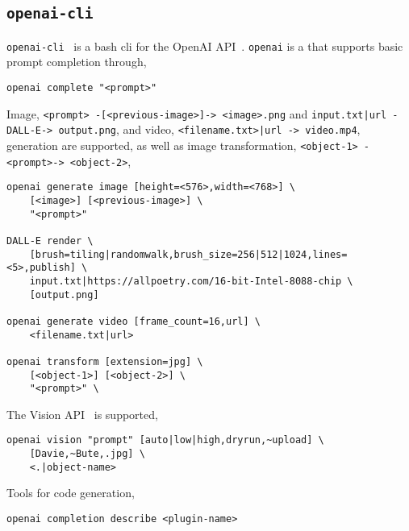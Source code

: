 \subsection{\texttt{openai-cli}}

\texttt{openai-cli}~ is a bash cli for the OpenAI API~. \texttt{openai} is a  that supports basic prompt completion through,
%
\begin{verbatim}
openai complete "<prompt>"
\end{verbatim}
%
Image, \texttt{<prompt> -[<previous-image>]-> <image>.png} and \texttt{input.txt|url -DALL-E-> output.png}, and video, \texttt{<filename.txt>|url -> video.mp4}, generation are supported, as well as image transformation, \texttt{<object-1> -<prompt>-> <object-2>},
%
\begin{verbatim}
openai generate image [height=<576>,width=<768>] \
    [<image>] [<previous-image>] \
    "<prompt>"

DALL-E render \
    [brush=tiling|randomwalk,brush_size=256|512|1024,lines=<5>,publish] \
    input.txt|https://allpoetry.com/16-bit-Intel-8088-chip \
    [output.png]

openai generate video [frame_count=16,url] \
    <filename.txt|url>

openai transform [extension=jpg] \
    [<object-1>] [<object-2>] \
    "<prompt>" \
\end{verbatim}
%
The Vision API~ is supported,
%
\begin{verbatim}
openai vision "prompt" [auto|low|high,dryrun,~upload] \
    [Davie,~Bute,.jpg] \
    <.|object-name>
\end{verbatim}
%
Tools for code generation,
%
\begin{verbatim}
openai completion describe <plugin-name>
\end{verbatim}